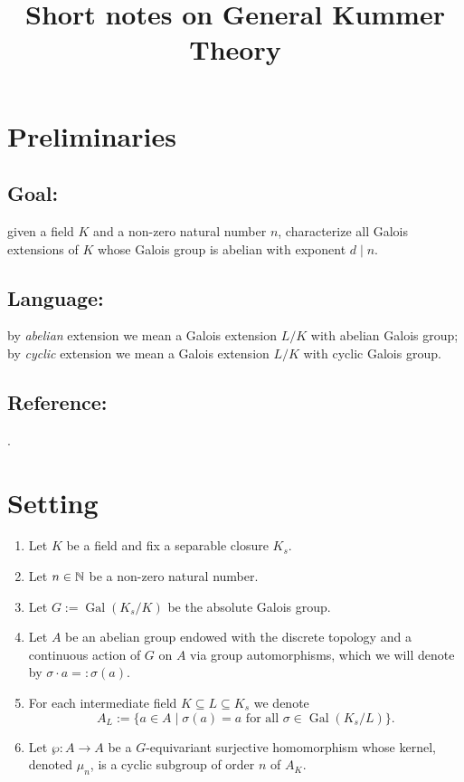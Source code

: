\documentclass[12pt]{amsart}
\DeclareMathOperator{\Gal}{Gal}
\begin{document}
\title{Short notes on General Kummer Theory}
\maketitle

\tableofcontents

\section{Preliminaries}

\subsection*{Goal:} given a field $K$ and a non-zero natural number $n$, characterize all Galois extensions of $K$ whose Galois group is abelian with exponent $d\mid n$.

\subsection*{Language:} by \textit{abelian} extension we mean a Galois extension $L/K$ with abelian Galois group; by \textit{cyclic} extension we mean a Galois extension $L/K$ with cyclic Galois group.

\subsection*{Reference:} \cite[\S 4.10]{bos18}.

\section{Setting}

\begin{enumerate}
    \item Let $K$ be a field and fix a separable closure $K_{s}$.
    \item Let $n\in \mathbb{N}$ be a non-zero natural number.
    \item Let $G:=\Gal(K_{s}/K)$ be the absolute Galois group.
    \item Let $A$ be an abelian group endowed with the discrete topology and a continuous action of $G$ on $A$ via group automorphisms, which we will denote by $\sigma \cdot a=:\sigma(a)$.
    \item For each intermediate field $K\subseteq L\subseteq K_{s}$ we denote
	\[ A_{L}:=\{ a\in A\mid \sigma(a)=a \text{ for all }\sigma\in \Gal(K_{s}/L)\}. \]
    \item Let $\wp\colon A\to A$ be a $G$-equivariant surjective homomorphism whose kernel, denoted $\mu_{n}$, is a cyclic subgroup of order $n$ of $A_{K}$.
\end{enumerate}
\end{document}

